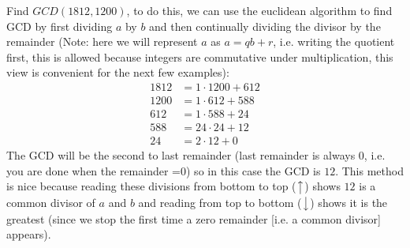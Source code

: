 \newpage
\begin{example}
Find $GCD(1812,1200)$, to do this, we can use the euclidean algorithm to find GCD by first dividing
$a$ by $b$ and then continually dividing the divisor by the remainder (Note: here we will represent
$a$ as $a=qb+r$, i.e. writing the quotient first, this is allowed because integers are commutative
under multiplication, this view is convenient for the next few examples):
\begin{align}
    1812 &=1\cdot1200+612\nonumber\\
    1200 &=1\cdot612+588 \nonumber\\
    612 &=1\cdot588+24 \nonumber\\
    588 &=24\cdot24+12 \nonumber\\
    24 &=2\cdot12+0 \nonumber
\end{align}
The GCD will be the second to last remainder (last remainder is always 0, i.e. you are done when the
remainder =0) so in this case the GCD is $12$. This method is nice because reading these divisions
from bottom to top ($\big\uparrow$) shows $12$ is a common divisor of $a$ and $b$ and reading from
top to bottom ($\big\downarrow$) shows it is the greatest (since we stop the first time a zero
remainder [i.e. a common divisor] appears).
\end{example}

